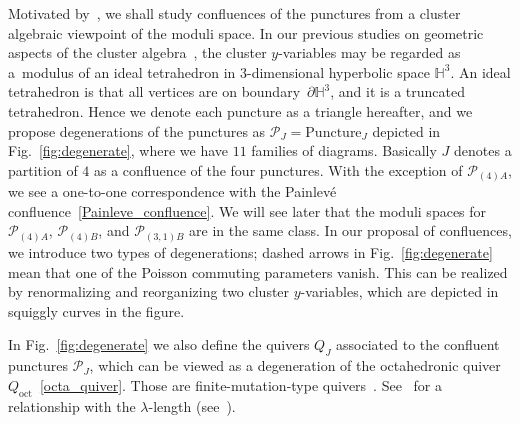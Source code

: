 \documentclass[10pt,a4paper]{amsart}
\numberwithin{equation}{section}
\begin{document}
Motivated by~\cite{ChekMazzRubt15a,ChekMazzRubt17a}, we shall study confluences of the punctures from a cluster algebraic viewpoint of the moduli space. In our previous studies on geometric aspects of the cluster algebra~\cite{HikamiRInoue12a}, the cluster $y$-variables may be regarded as a~modulus of an ideal tetrahedron in 3-dimensional hyperbolic space $\mathbb{H}^3$. An ideal tetrahedron is that
all vertices are on boundary~$\partial \mathbb{H}^3$, and it is a truncated tetrahedron. Hence we denote each puncture as a triangle hereafter, and we propose degenerations of the punctures as $\mathcal{P}_J=\text{Puncture}_J$ depicted in Fig.~\ref{fig:degenerate}, where we have $11$ families of diagrams. Basically $J$ denotes a partition of $4$ as a confluence of the four punctures. With the exception of $\mathcal{P}_{(4)A}$, we see a one-to-one correspondence with the Painlev{\'e} confluence~\eqref{Painleve_confluence}. We will see later that the moduli spaces for $\mathcal{P}_{(4)A}$, $\mathcal{P}_{(4)B}$, and $\mathcal{P}_{(3,1)B}$ are in the same class. In our proposal of confluences, we introduce two types of degenerations; dashed arrows in Fig.~\ref{fig:degenerate} mean that one of the Poisson commuting parameters vanish. This can be realized by renormalizing and reorganizing two cluster $y$-variables, which are depicted in squiggly curves in the figure.

In Fig.~\ref{fig:degenerate} we also define the quivers $Q_J$ associated to the confluent punctures $\mathcal{P}_J$, which can be viewed as a degeneration of the octahedronic quiver $Q_{\text{oct}}$~\eqref{octa_quiver}. Those are finite-mutation-type quivers~\cite{FomiShapThur08a}. See~\cite{FeliShapTuma12a} for a relationship with the $\lambda$-length (see~\cite{Penner12}).
\end{document}
